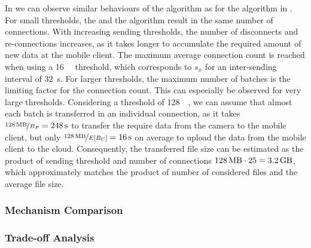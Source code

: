In  we can observe similar behaviours of the \algosize algorithm as for the \algointerval algorithm in .
For small thresholds, the \algosize and the \algoimmediate algorithm result in the same number of connections.
With increasing sending thresholds, the number of disconnects and re-connections increases, as it takes longer to accumulate the required amount of new data at the mobile client.
The maximum average connection count is reached when using a \SI{16}{\mega\byte} threshold, which corresponds to \(s_x\) for an inter-sending interval of \SI{32}{\second}.
For larger thresholds, the maximum number of batches is the limiting factor for the connection count.
This can especially be observed for very large thresholds.
Considering a threshold of \SI{128}{\mega\byte}, we can assume that almost each batch is transferred in an individual connection, as it takes $\nicefrac{\SI{128}{\mega\byte}}{\panTransferRate} = \SI{248}{\second}$ to transfer the require data from the camera to the mobile client, but only \(\nicefrac{\SI{128}{\mega\byte}}{E\left[\uploadbandwidth\right]} = \SI{16}{\second}\) on average to upload the data from the mobile client to the cloud.
Consequently, the transferred file size can be estimated as the product of sending threshold and number of connections \(\SI{128}{\mega\byte} \cdot 25 = \SI{3.2}{\giga\byte}\), which approximately matches the product of number of considered files and the average file size.

\subsubsection*{Mechanism Comparison}\label{sec:application:cloud_file_synchronisation:numerical_evaluation:mechanism_comparison}
\subsubsection*{Trade-off Analysis}\label{sec:application:cloud_file_synchronisation:numerical_evaluation:trade_off_analysis}